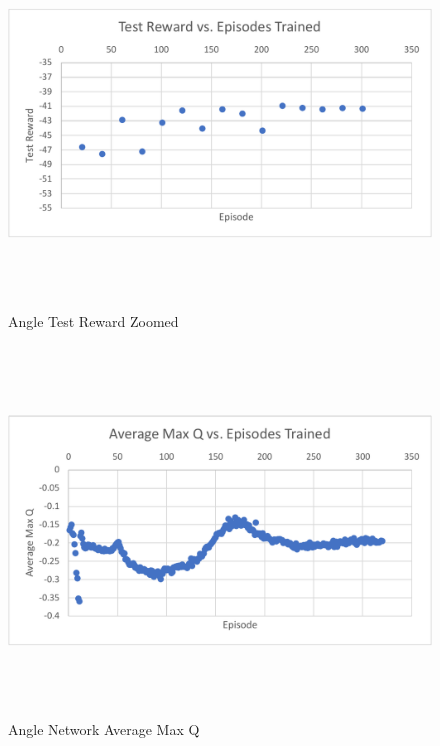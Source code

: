 \begin{figure}[H]
	\centering
	\includegraphics[width=6in, height=3.85in, keepaspectratio]{figures/train_figs/angle_rzoom.pdf}
	\caption{Angle Test Reward Zoomed} \label{fig:angle_rzoom}
\end{figure}
\begin{figure}[H]
	\centering
	\includegraphics[width=6in, height=3.85in, keepaspectratio]{figures/train_figs/angle_q.pdf}
	\caption{Angle Network Average Max Q} \label{fig:angle_q}
\end{figure}

